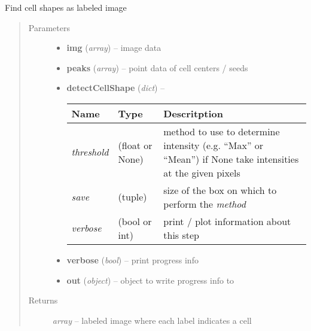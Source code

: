 \documentclass[letterpaper,10pt,english]{sphinxmanual}
\begin{document}
\begin{fulllineitems}
\label{api/ClearMap.ImageProcessing:ClearMap.ImageProcessing.CellSizeDetection.detectCellShape}
Find cell shapes as labeled image
\begin{quote}\begin{description}
\item[{Parameters}] \leavevmode\begin{itemize}
\item {} 
\textbf{img} (\emph{array}) --
image data

\item {} 
\textbf{peaks} (\emph{array}) --
point data of cell centers / seeds

\item {} 
\textbf{detectCellShape} (\emph{dict}) --

\begin{tabulary}{\linewidth}{|L|L|L|}
\hline
\textsf{\relax 
Name
} & \textsf{\relax 
Type
} & \textsf{\relax 
Descritption
}\\
\hline
\emph{threshold}
 & 
(float or None)
 & 
method to use to determine intensity (e.g. ``Max'' or ``Mean'')
if None take intensities at the given pixels
\\
\hline
\emph{save}
 & 
(tuple)
 & 
size of the box on which to perform the \emph{method}
\\
\hline
\emph{verbose}
 & 
(bool or int)
 & 
print / plot information about this step
\\
\hline\end{tabulary}


\item {} 
\textbf{verbose} (\emph{bool}) --
print progress info

\item {} 
\textbf{out} (\emph{object}) --
object to write progress info to

\end{itemize}

\item[{Returns}] \leavevmode
\emph{array} --
labeled image where each label indicates a cell

\end{description}\end{quote}

\end{fulllineitems}
\end{document}
